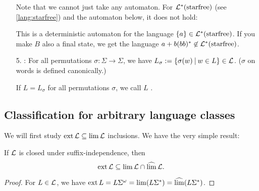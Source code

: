 \begin{enumerate}
Note that we cannot just take any automaton. For $\mathcal{L}^*(\textup{\textrm{starfree}})$ (see \cref{lang:starfree}) and the automaton below, it does not hold:

  
This is a deterministic automaton for the language $\Set{a} \in \Lang^*(\mathtext{starfree})$. If you make $B$ also a final state, we get the language $a + b(bb)^* \not\in \mathcal{L}^*(\textup{\textrm{starfree}})$.

\item[5.] : For all permutations $\sigma : \Sigma \rightarrow \Sigma$, we have $L_\sigma := \Set{\sigma(w)}{w \in L} \in \Lang$. ($\sigma$ on words is defined canonically.)

If $L = L_\sigma$ for all permutations $\sigma$, we call $L$ .

\end{enumerate}

\subsection{Classification for arbitrary language classes}
\label{gen:section:classification}

We will first study $\operatorname{ext} \mathcal{L} \subseteq \lim \mathcal{L}$ inclusions. We have the very simple result:
\begin{lemma}
\label{gen:non-suffix-sens}
If $\mathcal{L}$ is closed under suffix-independence, then
\[ \operatorname{ext} \mathcal{L} \subseteq \lim \mathcal{L} \cap \operatorname{\widehat{lim}} \mathcal{L} . \]
\begin{proof}
For $L \in \mathcal{L}$, we have $\operatorname{ext} L = L \Sigma^\omega = \lim (L \Sigma^*) = \operatorname{\widehat{lim}} (L \Sigma^*)$.
\end{proof}
\end{lemma}

